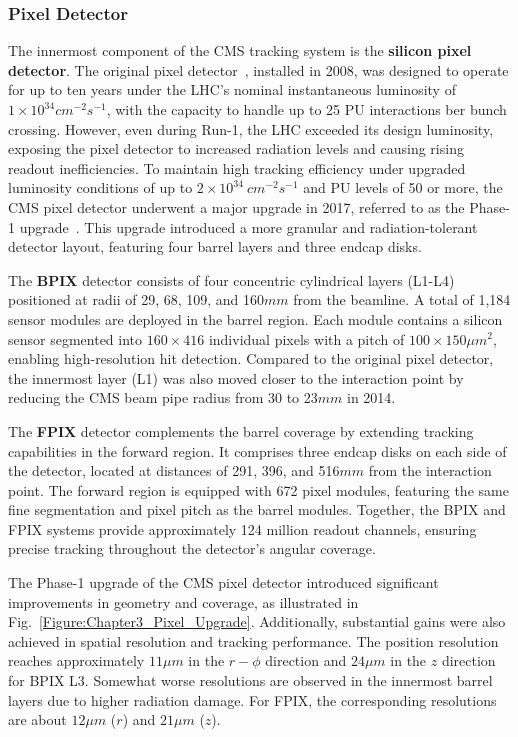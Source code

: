 \newpage
\subsubsection{Pixel Detector}

The innermost component of the CMS tracking system is the \textbf{silicon pixel detector}. The original pixel detector~\cite{LHC_CMS}, installed in 2008, was designed to operate for up to ten years under the LHC’s nominal instantaneous luminosity of $1 \times 10^{34}\unit{cm}^{-2}\unit{s}^{-1}$, with the capacity to handle up to 25 PU interactions ber bunch crossing. However, even during Run-1, the LHC exceeded its design luminosity, exposing the pixel detector to increased radiation levels and causing rising readout inefficiencies. To maintain high tracking efficiency under upgraded luminosity conditions of up to $2 \times 10^{34}~\unit{cm}^{-2}\unit{s}^{-1}$ and PU levels of 50 or more, the CMS pixel detector underwent a major upgrade in 2017, referred to as the Phase-1 upgrade~\cite{CMS_Detector_Run3, CMS_Tracker_Phase1_Upgrade}. This upgrade introduced a more granular and radiation-tolerant detector layout, featuring four barrel layers and three endcap disks.

The \textbf{\ac{BPIX}} detector consists of four concentric cylindrical layers (L1-L4) positioned at radii of 29, 68, 109, and 160$\unit{mm}$ from the beamline. A total of 1,184 sensor modules are deployed in the barrel region. Each module contains a silicon sensor segmented into $160 \times 416$ individual pixels with a pitch of $100 \times 150\unit{\mu m}^2$, enabling high-resolution hit detection. Compared to the original pixel detector, the innermost layer (L1) was also moved closer to the interaction point by reducing the CMS beam pipe radius from 30 to 23$\unit{mm}$ in 2014. 

The \textbf{\ac{FPIX}} detector complements the barrel coverage by extending tracking capabilities in the forward region. It comprises three endcap disks on each side of the detector, located at distances of 291, 396, and 516$\unit{mm}$ from the interaction point. The forward region is equipped with 672 pixel modules, featuring the same fine segmentation and pixel pitch as the barrel modules. Together, the BPIX and FPIX systems provide approximately 124 million readout channels, ensuring precise tracking throughout the detector’s angular coverage.

The Phase-1 upgrade of the CMS pixel detector introduced significant improvements in geometry and coverage, as illustrated in Fig.~\ref{Figure:Chapter3_Pixel_Upgrade}. Additionally, substantial gains were also achieved in spatial resolution and tracking performance. The position resolution reaches approximately $11\unit{\mu m}$ in the $r-\phi$ direction and $24\unit{\mu m}$ in the $z$ direction for BPIX L3. Somewhat worse resolutions are observed in the innermost barrel layers due to higher radiation damage. For FPIX, the corresponding resolutions are about $12\unit{\mu m}$ ($r$) and $21\unit{\mu m}$ ($z$). 

